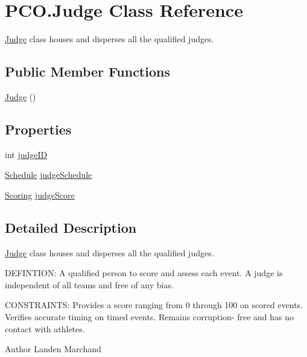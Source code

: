\hypertarget{classPCO_1_1Judge}{\section{P\+C\+O.\+Judge Class Reference}
\label{classPCO_1_1Judge}
}


\hyperlink{classPCO_1_1Judge}{Judge} class houses and disperses all the qualified judges.  


\subsection*{Public Member Functions}
\begin{DoxyCompactItemize}
\item 
\hyperlink{classPCO_1_1Judge_a6739597d9c654fc3609d0d446288aff9}{Judge} ()
\end{DoxyCompactItemize}
\subsection*{Properties}
\begin{DoxyCompactItemize}
\item 
int \hyperlink{classPCO_1_1Judge_ae025be7243620fb90013477bc81bb6ad}{judge\+I\+D}
\item 
\hyperlink{classPCO_1_1Schedule}{Schedule} \hyperlink{classPCO_1_1Judge_abc1631a408c0d72e62daa23783cc6330}{judge\+Schedule}
\item 
\hyperlink{classPCO_1_1Scoring}{Scoring} \hyperlink{classPCO_1_1Judge_a76d950e6f90615fe320c12db369da4c4}{judge\+Score}
\end{DoxyCompactItemize}


\subsection{Detailed Description}
\hyperlink{classPCO_1_1Judge}{Judge} class houses and disperses all the qualified judges. 

D\+E\+F\+I\+N\+T\+I\+O\+N\+: A qualified person to score and assess each event. A judge is independent of all teams and free of any bias.

C\+O\+N\+S\+T\+R\+A\+I\+N\+T\+S\+: Provides a score ranging from 0 through 100 on scored events. Verifies accurate timing on timed events. Remains corruption-\/ free and has no contact with athletes.\begin{DoxyAuthor}{Author}
Landen Marchand 
\end{DoxyAuthor}


